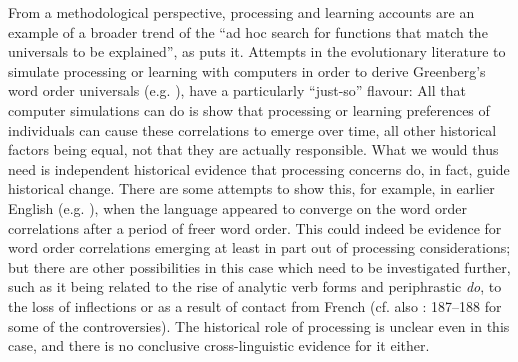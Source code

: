 \documentclass[output=paper]{langsci/langscibook}
\begin{document}
From a methodological perspective, processing and learning accounts are an example of a broader trend of the “ad hoc search for functions that match the universals to be explained”, as \citet[13]{Kirby1999} puts it. Attempts in the evolutionary literature to simulate processing or learning with computers in order to derive Greenberg’s word order universals (e.g. \citealt{VanEverbroeck1999,KirbyChristiansen2003}), have a particularly “just-so” flavour: All that computer simulations can do is show that processing or learning preferences of individuals can cause these correlations to emerge over time, all other historical factors being equal, not that they are actually responsible. What we would thus need is independent historical evidence that processing concerns do, in fact, guide historical change. There are some attempts to show this, for example, in earlier English (e.g. \citealt{Fischer1992,ClarkEtAl2008}), when the language appeared to converge on the word order correlations after a period of freer word order. This could indeed be evidence for word order correlations emerging at least in part out of processing considerations; but there are other possibilities in this case which need to be investigated further, such as it being related to the rise of analytic verb forms and periphrastic \textit{do}, to the loss of inflections or as a result of contact from French (cf. also  \citealt{FischervanderWurff2006}: 187–188 for some of the controversies). The historical role of processing is unclear even in this case, and there is no conclusive cross-linguistic evidence for it either.
\end{document}

